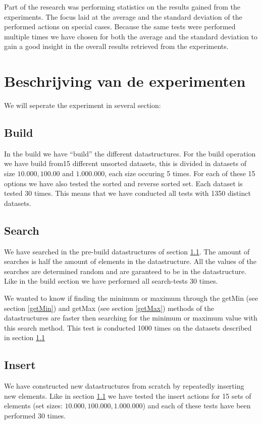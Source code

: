 \documentclass{article}
\begin{document}
Part of the research was performing statistics on the results gained from the experiments. The focus laid at the average and the standard deviation of the performed actions on special cases. Because the same tests were performed multiple times we have chosen for both the average and the standard deviation to gain a good insight in the overall results retrieved from the experiments. 

\section{Beschrijving van de experimenten}
We will seperate the experiment in several section:
\subsection{Build}
\label{Build}
In the build we have ``build'' the different datastructures. 
For the build operation we have build from15 different unsorted datasets, this is divided in datasets of size $10.000, 100.00$ and $1.000.000$, each size occuring 5 times.  For each of these 15 options we have also tested the sorted and reverse sorted set. Each dataset is tested 30 times. This means that we have conducted all tests with 1350 distinct datasets.
\subsection{Search}
We have searched in the pre-build datastructures of section \ref{Build}. The amount of searches is half the amount of elements in the datastructure. All the values of the searches are determined random and are garanteed to be in the datastructure. Like in the build section we have performed all search-tests 30 times. 

We wanted to know if finding the minimum or maximum through the getMin (see section \ref{getMin}) and getMax (see section \ref{getMax}) methods of the datastructures are faster then searching for the minimum or maximum value with this search method. This test is conducted 1000 times on the datasets described in section \ref{Build}
\subsection{Insert}
We have constructed new datastructures from scratch by repeatedly inserting new elements. Like in section \ref{Build} we have tested the insert actions for 15 sets of elements (set sizes: $10.000, 100.000, 1.000.000$) and each of these tests have been performed 30 times.
\end{document}
